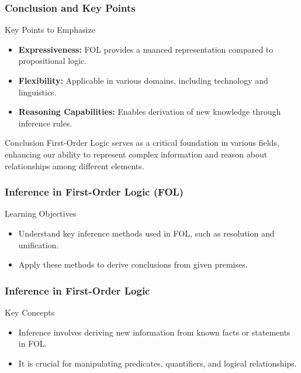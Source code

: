 \documentclass[aspectratio=169]{beamer}
\begin{document}
\begin{frame}[fragile]
    \frametitle{Conclusion and Key Points}
    \begin{block}{Key Points to Emphasize}
        \begin{itemize}
            \item \textbf{Expressiveness:} FOL provides a nuanced representation compared to propositional logic.
            \item \textbf{Flexibility:} Applicable in various domains, including technology and linguistics.
            \item \textbf{Reasoning Capabilities:} Enables derivation of new knowledge through inference rules.
        \end{itemize}
    \end{block}
    
    \begin{block}{Conclusion}
        First-Order Logic serves as a critical foundation in various fields, enhancing our ability to represent complex information and reason about relationships among different elements.
    \end{block}
\end{frame}

\begin{frame}[fragile]
    \frametitle{Inference in First-Order Logic (FOL)}
    \begin{block}{Learning Objectives}
        \begin{itemize}
            \item Understand key inference methods used in FOL, such as resolution and unification.
            \item Apply these methods to derive conclusions from given premises.
        \end{itemize}
    \end{block}
\end{frame}

\begin{frame}[fragile]
    \frametitle{Inference in First-Order Logic}
    \begin{block}{Key Concepts}
        \begin{itemize}
            \item Inference involves deriving new information from known facts or statements in FOL.
            \item It is crucial for manipulating predicates, quantifiers, and logical relationships.
        \end{itemize}
    \end{block}
\end{frame}
\end{document}
